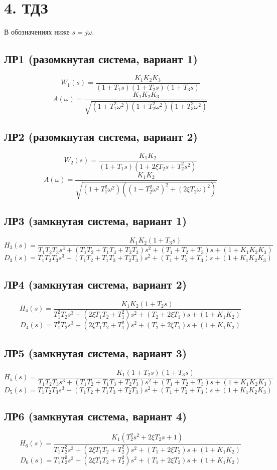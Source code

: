 \documentclass[12pt,a4paper]{article}
\begin{document}
\section*{4. ТДЗ}

В обозначениях ниже \(s=j\omega\).

\subsection*{ЛР1 (разомкнутая система, вариант 1)}
\[
W_1(s)=\frac{K_1K_2K_3}{(1+T_1s)(1+T_2s)(1+T_3s)}
\]
\[
A(\omega)=\frac{K_1K_2K_3}{\sqrt{(1+T_1^2\omega^2)(1+T_2^2\omega^2)(1+T_3^2\omega^2)}}
\]

\subsection*{ЛР2 (разомкнутая система, вариант 2)}
\[
W_2(s)=\frac{K_1K_2}{(1+T_1s)\left(1+2\xi T_2s+T_2^2s^2\right)}
\]
\[
A(\omega)=\frac{K_1K_2}{\sqrt{(1+T_1^2\omega^2)\left((1-T_2^2\omega^2)^2+(2\xi T_2\omega)^2\right)}}
\]

\subsection*{ЛР3 (замкнутая система, вариант 1)}
\[
H_3(s)=\frac{K_1K_2(1+T_3s)}
{T_1T_2T_3s^3+(T_1T_2+T_1T_3+T_2T_3)s^2+(T_1+T_2+T_3)s+(1+K_1K_2K_3)}
\]
\[
D_3(s)=T_1T_2T_3s^3+(T_1T_2+T_1T_3+T_2T_3)s^2+(T_1+T_2+T_3)s+(1+K_1K_2K_3)
\]

\subsection*{ЛР4 (замкнутая система, вариант 2)}
\[
H_4(s)=\frac{K_1K_2(1+T_2s)}
{T_1^2T_2s^3+(2\xi T_1T_2+T_1^2)s^2+(T_2+2\xi T_1)s+(1+K_1K_2)}
\]
\[
D_4(s)=T_1^2T_2s^3+(2\xi T_1T_2+T_1^2)s^2+(T_2+2\xi T_1)s+(1+K_1K_2)
\]

\subsection*{ЛР5 (замкнутая система, вариант 3)}
\[
H_5(s)=\frac{K_1(1+T_2s)(1+T_3s)}
{T_1T_2T_3s^3+(T_1T_2+T_1T_3+T_2T_3)s^2+(T_1+T_2+T_3)s+(1+K_1K_2K_3)}
\]
\[
D_5(s)=T_1T_2T_3s^3+(T_1T_2+T_1T_3+T_2T_3)s^2+(T_1+T_2+T_3)s+(1+K_1K_2K_3)
\]

\subsection*{ЛР6 (замкнутая система, вариант 4)}
\[
H_6(s)=\frac{K_1(T_2^2s^2+2\xi T_2s+1)}
{T_1T_2^2s^3+(2\xi T_1T_2+T_2^2)s^2+(T_1+2\xi T_2)s+(1+K_1K_2)}
\]
\[
D_6(s)=T_1T_2^2s^3+(2\xi T_1T_2+T_2^2)s^2+(T_1+2\xi T_2)s+(1+K_1K_2)
\]
\end{document}

